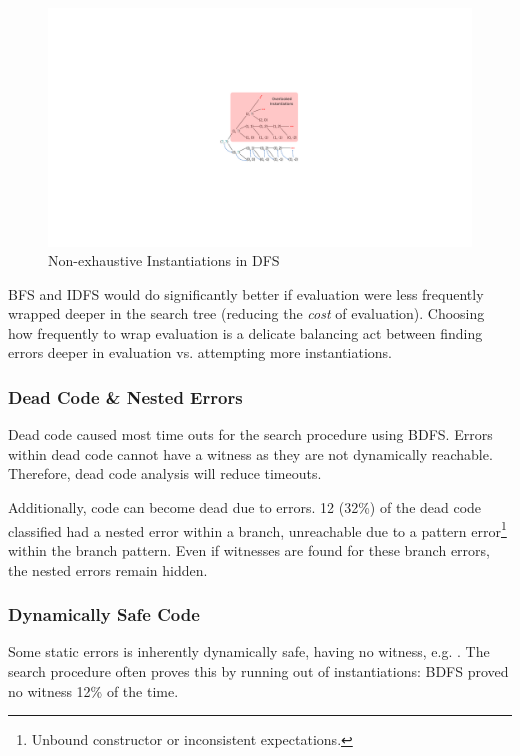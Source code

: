 \begin{figure}[H]
\centering
\includegraphics[width=1.25\textwidth, trim={15cm 10cm 10cm 10cm},clip]{Media/Figures/DFS}
\caption{Non-exhaustive Instantiations in DFS}
\label{fig:DFS}
\end{figure}
BFS and IDFS would do significantly better if evaluation were less frequently wrapped deeper in the search tree (reducing the \textit{cost} of evaluation).  Choosing how frequently to wrap evaluation is a delicate balancing act between finding errors deeper in evaluation vs. attempting more instantiations.

\subsubsection{Dead Code \& Nested Errors}

Dead code caused most time outs for the search procedure using BDFS. Errors within dead code cannot have a witness as they are not dynamically reachable. Therefore, dead code analysis will reduce timeouts.

Additionally, code can become dead due to errors. 12 (32\%) of the dead code classified had a nested error within a branch, unreachable due to a pattern error\footnote{Unbound constructor or inconsistent expectations.} within the branch pattern. Even if witnesses are found for these branch errors, the nested errors remain hidden.

\subsubsection{Dynamically Safe Code}
Some static errors is inherently dynamically safe, having no witness, e.g. . The search procedure often proves this by running out of instantiations: BDFS proved no witness 12\% of the time. 

